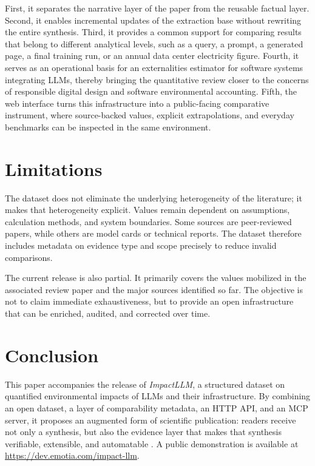 \documentclass[11pt,a4paper]{article}
\begin{document}
First, it separates the narrative layer of the paper from the reusable factual layer. Second, it enables incremental updates of the extraction base without rewriting the entire synthesis. Third, it provides a common support for comparing results that belong to different analytical levels, such as a query, a prompt, a generated page, a final training run, or an annual data center electricity figure. Fourth, it serves as an operational basis for an externalities estimator for software systems integrating LLMs, thereby bringing the quantitative review closer to the concerns of responsible digital design and software environmental accounting. Fifth, the web interface turns this infrastructure into a public-facing comparative instrument, where source-backed values, explicit extrapolations, and everyday benchmarks can be inspected in the same environment.

\section{Limitations}
The dataset does not eliminate the underlying heterogeneity of the literature; it makes that heterogeneity explicit. Values remain dependent on assumptions, calculation methods, and system boundaries. Some sources are peer-reviewed papers, while others are model cards or technical reports. The dataset therefore includes metadata on evidence type and scope precisely to reduce invalid comparisons.

The current release is also partial. It primarily covers the values mobilized in the associated review paper and the major sources identified so far. The objective is not to claim immediate exhaustiveness, but to provide an open infrastructure that can be enriched, audited, and corrected over time.

\section{Conclusion}
This paper accompanies the release of \emph{ImpactLLM}, a structured dataset on quantified environmental impacts of LLMs and their infrastructure. By combining an open dataset, a layer of comparability metadata, an HTTP API, and an MCP server, it proposes an augmented form of scientific publication: readers receive not only a synthesis, but also the evidence layer that makes that synthesis verifiable, extensible, and automatable \cite{impactllmrepo2026}. A public demonstration is available at \url{https://dev.emotia.com/impact-llm}.
\end{document}
